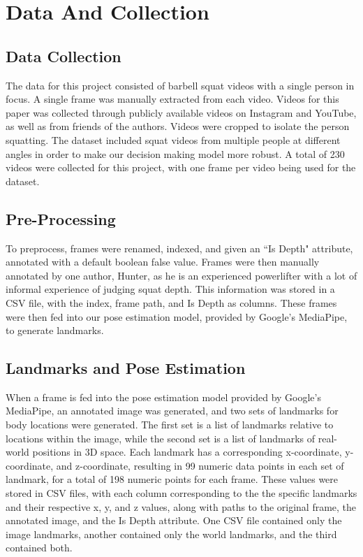 \section{Data And Collection}
\label{sec:formatting}
\subsection{Data Collection}
The data for this project consisted of barbell squat videos with a single person in focus. A single frame was manually extracted from each video. Videos for this paper was collected through publicly available videos on Instagram and YouTube, as well as from friends of the authors. Videos were cropped to isolate the person squatting. The dataset included squat videos from multiple people at different angles in order to make our decision making model more robust. A total of 230 videos were collected for this project, with one frame per video being used for the dataset. 
\subsection{Pre-Processing}
To preprocess, frames were renamed, indexed, and given an  ``Is Depth" attribute, annotated with a default boolean false value. Frames were then manually annotated by one author, Hunter, as he is an experienced powerlifter with a lot of informal experience of judging squat depth. This information was stored in a CSV file, with the index, frame path, and Is Depth as columns. These frames were then fed into our pose estimation model, provided by Google's MediaPipe, to generate landmarks.  
\subsection{Landmarks and Pose Estimation}
When a frame is fed into the pose estimation model provided by Google's MediaPipe, an annotated image was generated, and two sets of landmarks for body locations were generated. The first set is a list of landmarks relative to locations within the image, while the second set is a list of landmarks of real-world positions in 3D space. Each landmark has a corresponding x-coordinate, y-coordinate, and z-coordinate, resulting in 99 numeric data points in each set of landmark, for a total of 198 numeric points for each frame. These values were stored in CSV files, with each column corresponding to the the specific landmarks and their respective x, y, and z values, along with paths to the original frame, the annotated image, and the Is Depth attribute. One CSV file contained only the image landmarks, another contained only the world landmarks, and the third contained both.


